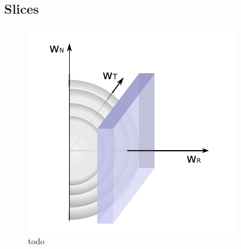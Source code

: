 \clearpage
\subsection{Slices}



\begin{figure}[h]
	\includegraphics[width=.4\textwidth]{Figures/slice_R2.pdf}
	\centering
	\caption{todo}
	\label{fig:sketch_slice_R}
\end{figure}


